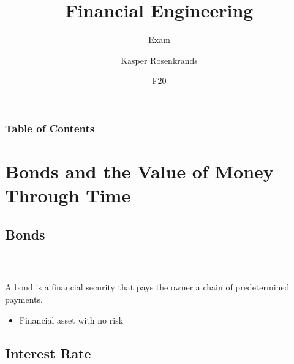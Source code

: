 \documentclass{beamer}
\title{Financial Engineering}
\subtitle{Exam}
\author{Kasper Rosenkrands}
\institute{Aalborg University}
\date{F20}
\numberwithin{equation}{section}
\begin{document}
\frame{\titlepage}

\begin{frame}
\frametitle{Table of Contents}
\tableofcontents[hideallsubsections]
\end{frame}

\section{Bonds and the Value of Money Through Time}

\subsection{Bonds}

\begin{frame}\frametitle{{\normalsize \secname} \\ {\large \subsecname}}
    \begin{definition}[Bond]\label{def:bond}
        A bond is a financial security that pays the owner a chain of predetermined payments.
    \end{definition}
    \pause
    \begin{itemize}
        \item Financial asset with no risk
    \end{itemize}
\end{frame}

%

\subsection{Interest Rate}
\end{document}
